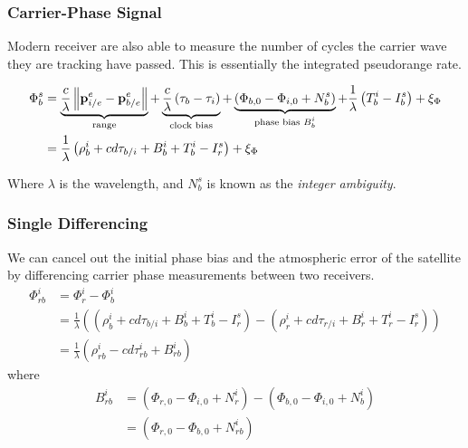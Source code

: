 \documentclass{beamer}
\newcommand{\norm}[1]{\left\lVert#1\right\rVert}
\begin{document}
\begin{frame}\frametitle{Carrier-Phase Signal}
Modern receiver are also able to measure the number of cycles the carrier wave they are tracking have passed.  This is essentially the integrated pseudorange rate.

\begin{align}
\Phi_{b}^s&=\underbrace{\frac{c}{\lambda}\norm{\p_{i/e}^{e}-\p_{b/e}^{e}}}_{\text{range}}+\underbrace{\frac{c}{\lambda}\left(\tau_{b}-\tau_{i}\right)}_{\text{clock bias}}+\underbrace{\left(\Phi_{b,0}-\Phi_{i,0}+N_{b}^{s}\right)}_{\text{phase bias $B_{b}^{i}$}}+\frac{1}{\lambda}\left(T_b^i - I_b^s\right) + \xi_{\Phi} \\
&= \frac{1}{\lambda}\left( \rho_b^i + cd\tau_{b/i} + B_b^i + T_b^i - I_r^s \right) + \xi_{\Phi}
\end{align}

Where $\lambda$ is the wavelength, and $N_{b}^{s}$ is known as the \emph{integer ambiguity}.
\end{frame}

\begin{frame}\frametitle{Single Differencing}
We can cancel out the initial phase bias and the atmospheric error of the satellite by differencing carrier phase measurements between two receivers.
\begin{align*}
	\Phi_{rb}^{i} &=\Phi_{r}^{i}-\Phi_{b}^{i} \nonumber\\
	&= \frac{1}{\lambda}\left( \left(\rho_b^i + cd\tau_{b/i} + B_b^i + T_b^i - I_r^s\right)- \left(\rho_r^i + cd\tau_{r/i} + B_r^i + T_r^i - I_r^s \right)\right) \nonumber\\
	&= \frac{1}{\lambda} \left(\rho_{rb}^i -cd\tau_{rb}^i + B_{rb}^i\right)
\end{align*}
where
\begin{align*}
B_{rb}^{i} & =\left(\Phi_{r,0}-\Phi_{i,0}+N_{r}^{i}\right)-\left(\Phi_{b,0}-\Phi_{i,0}+N_{b}^{i}\right)\\
 & =\left(\Phi_{r,0}-\Phi_{b,0}+N_{rb}^{i}\right)
\end{align*}
\end{frame}
\end{document}
